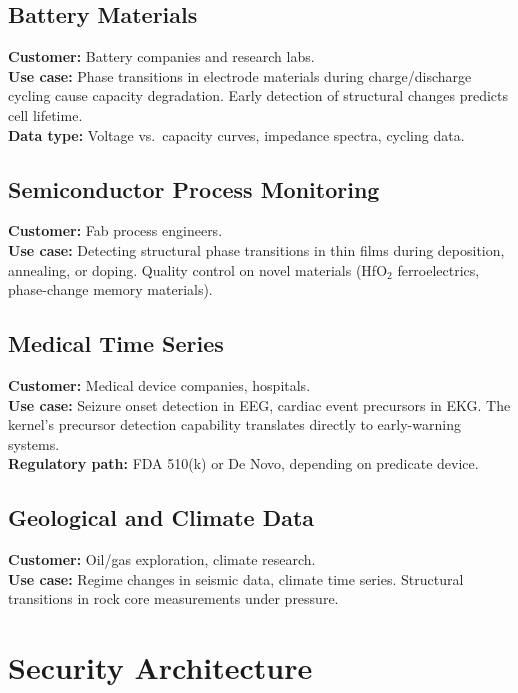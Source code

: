 \documentclass[11pt,letterpaper]{article}
\begin{document}
\subsection{Battery Materials}

\textbf{Customer:} Battery companies and research labs. \\
\textbf{Use case:} Phase transitions in electrode materials during
  charge/discharge cycling cause capacity degradation. Early detection
  of structural changes predicts cell lifetime. \\
\textbf{Data type:} Voltage vs.\ capacity curves, impedance spectra,
  cycling data.

\subsection{Semiconductor Process Monitoring}

\textbf{Customer:} Fab process engineers. \\
\textbf{Use case:} Detecting structural phase transitions in thin films
  during deposition, annealing, or doping. Quality control on novel
  materials (HfO$_2$ ferroelectrics, phase-change memory materials).

\subsection{Medical Time Series}

\textbf{Customer:} Medical device companies, hospitals. \\
\textbf{Use case:} Seizure onset detection in EEG, cardiac event
  precursors in EKG. The kernel's precursor detection capability
  translates directly to early-warning systems. \\
\textbf{Regulatory path:} FDA 510(k) or De Novo, depending on
  predicate device.

\subsection{Geological and Climate Data}

\textbf{Customer:} Oil/gas exploration, climate research. \\
\textbf{Use case:} Regime changes in seismic data, climate time series.
  Structural transitions in rock core measurements under pressure.

\section{Security Architecture}
\end{document}
